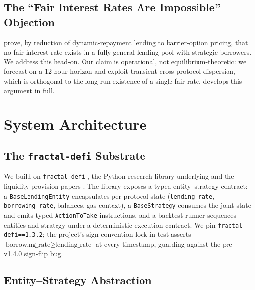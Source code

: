 \documentclass[11pt,a4paper]{article}
\begin{document}
\subsection{The ``Fair Interest Rates Are Impossible'' Objection}
\label{sec:fair-rates}

\cite{halpern2024fairrates} prove, by reduction of dynamic-repayment
lending to barrier-option pricing, that no fair interest rate exists
in a fully general lending pool with strategic borrowers. We address
this head-on. Our claim is operational, not equilibrium-theoretic: we
forecast on a 12-hour horizon and exploit transient
cross-protocol dispersion, which is orthogonal to the long-run
existence of a single fair rate. 
develops this argument in full.

\section{System Architecture}
\label{sec:architecture}

\subsection{The \texttt{fractal-defi} Substrate}
\label{sec:fractal}

We build on \texttt{fractal-defi} \cite{fractaldefi2026}, the Python
research library underlying \cite{krestenko2026basis} and the
liquidity-provision papers \cite{urusov2024clmm,urusov2025dynlp}.
The library exposes a typed entity--strategy contract: a
\texttt{BaseLendingEntity} encapsulates per-protocol state
(\texttt{lending\_rate}, \texttt{borrowing\_rate}, balances, gas
context), a \texttt{BaseStrategy} consumes the joint state and emits
typed \texttt{ActionToTake} instructions, and a backtest runner
sequences entities and strategy under a deterministic execution
contract. We pin \texttt{fractal-defi==1.3.2}; the project's
sign-convention lock-in test asserts
$\text{borrowing\_rate}\ge \text{lending\_rate}$ at every timestamp,
guarding against the pre-v1.4.0 sign-flip bug.

\subsection{Entity--Strategy Abstraction}
\label{sec:entities}
\end{document}

